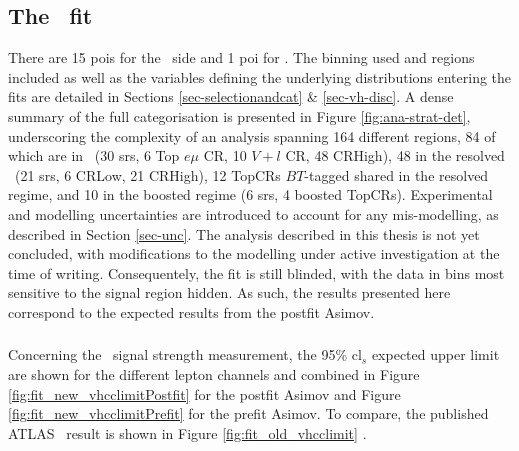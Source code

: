 \subsection[The \vhbc\ Fit]{The \boldvhbc\ fit}\label{subsec-subsecVHBCfit}
There are 15 \gls{poi}s for the \vhb\ side and 1 \gls{poi} for \vhc. The binning used and regions included as well as the variables defining the underlying distributions entering the fits are detailed in Sections \ref{sec-selectionandcat} \& \ref{sec-vh-disc}. A dense summary of the full categorisation is presented in Figure \ref{fig:ana-strat-det}, underscoring the complexity of an analysis spanning 164 different regions, 84 of which are in \vhc\ (30 \gls{sr}s, 6 Top $e\mu$ CR, 10 $V+l$ CR, 48 CRHigh), 48 in the resolved \vhb\ (21 \gls{sr}s, 6 CRLow, 21 CRHigh), 12 TopCRs $BT$-tagged shared in the resolved regime, and 10 in the boosted regime (6 \gls{sr}s, 4 boosted TopCRs). Experimental and modelling uncertainties are introduced to account for any mis-modelling, as described in Section \ref{sec-unc}. The analysis described in this thesis is not yet concluded, with modifications to the modelling under active investigation at the time of writing. Consequentely, the fit is still blinded, with the data in bins most sensitive to the signal region hidden. As such, the results presented here correspond to the expected results from the postfit Asimov.  %

\subsubsection{\boldvhc}
Concerning the \vhc\ signal strength measurement, the 95\% \gls{cl}$_s$ expected upper limit are shown for the different lepton channels and combined in Figure \ref{fig:fit_new_vhcclimitPostfit} for the postfit Asimov and Figure \ref{fig:fit_new_vhcclimitPrefit} for the prefit Asimov. To compare, the published ATLAS \vhc\ result is shown in Figure \ref{fig:fit_old_vhcclimit} \cite{Collaboration:2721696}.

